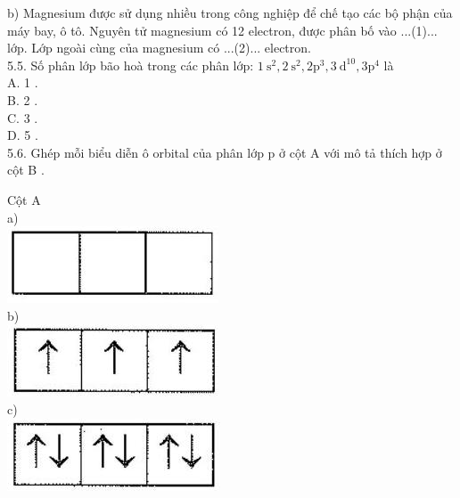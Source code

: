 \documentclass[10pt]{article}
\begin{document}
b) Magnesium được sử dụng nhiều trong công nghiệp để chế tạo các bộ phận của máy bay, ô tô. Nguyên tử magnesium có 12 electron, được phân bố vào ...(1)... lớp. Lớp ngoài cùng của magnesium có ...(2)... electron.\\
5.5. Số phân lớp bão hoà trong các phân lớp: $1 \mathrm{~s}^{2}, 2 \mathrm{~s}^{2}, 2 \mathrm{p}^{3}, 3 \mathrm{~d}^{10}, 3 \mathrm{p}^{4}$ là\\
A. 1 .\\
B. 2 .\\
C. 3 .\\
D. 5 .\\
5.6. Ghép mỗi biểu diễn ô orbital của phân lớp p ở cột A với mô tả thích hợp ở cột B .

Cột A\\
a)\\
\includegraphics[max width=\textwidth, center]{2025_10_23_76620c17ffac1ae9b35bg-11(2)}\\
b)\\
\includegraphics[max width=\textwidth, center]{2025_10_23_76620c17ffac1ae9b35bg-11(1)}\\
c)\\
\includegraphics[max width=\textwidth, center]{2025_10_23_76620c17ffac1ae9b35bg-11}
\end{document}
